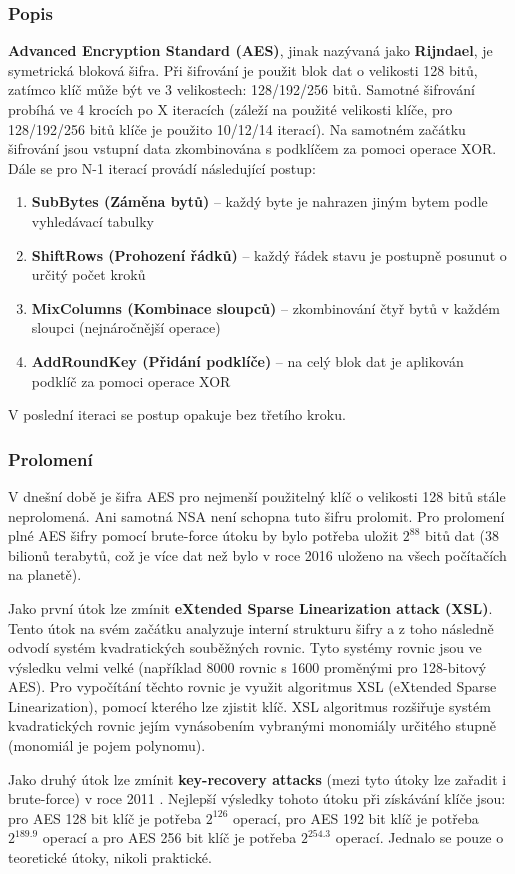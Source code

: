 \documentclass[12pt, a4paper]{article}
\begin{document}
		\subsubsection{Popis}
		\textbf{Advanced Encryption Standard (AES)}, jinak nazývaná jako \textbf{Rijndael}, je symetrická bloková šifra. Při šifrování je použit blok dat o velikosti 128 bitů, zatímco klíč může být ve 3 velikostech: 128/192/256 bitů. Samotné šifrování probíhá ve 4 krocích po X iteracích (záleží na použité velikosti klíče, pro 128/192/256 bitů klíče je použito 10/12/14 iterací). Na samotném začátku šifrování jsou vstupní data zkombinována s podklíčem za pomoci operace XOR. Dále se pro N-1 iterací provádí následující postup:
	\begin{enumerate}
	\item \textbf{SubBytes (Záměna bytů)} -- každý byte je nahrazen jiným bytem podle vyhledávací tabulky
	\item \textbf{ShiftRows (Prohození řádků)} -- každý řádek stavu je postupně posunut o určitý počet kroků
	\item \textbf{MixColumns (Kombinace sloupců)} -- zkombinování čtyř bytů v každém sloupci (nejnáročnější operace)
	\item \textbf{AddRoundKey (Přidání podklíče)} -- na celý blok dat je aplikován podklíč za pomoci operace XOR
	\end{enumerate}
	V poslední iteraci se postup opakuje bez třetího kroku.
		\subsubsection{Prolomení}
		V dnešní době je šifra AES pro nejmenší použitelný klíč o velikosti 128 bitů stále neprolomená. Ani samotná NSA není schopna tuto šifru prolomit. Pro prolomení plné AES šifry pomocí brute-force útoku by bylo potřeba uložit $2^{88}$ bitů dat (38 bilionů terabytů, což je více dat než bylo v roce 2016 uloženo na všech počítačích na planetě).
		\par Jako první útok lze zmínit \textbf{eXtended Sparse Linearization attack (XSL)}. Tento útok na svém začátku analyzuje interní strukturu šifry a z toho následně odvodí systém kvadratických souběžných rovnic. Tyto systémy rovnic jsou ve výsledku velmi velké (například 8000 rovnic s 1600 proměnými pro 128-bitový AES). Pro vypočítání těchto rovnic je využit algoritmus XSL (eXtended Sparse Linearization), pomocí kterého lze zjistit klíč. XSL algoritmus rozšiřuje systém kvadratických rovnic jejím vynásobením vybranými monomiály určitého stupně (monomiál je pojem polynomu).
		\par Jako druhý útok lze zmínit \textbf{key-recovery attacks} (mezi tyto útoky lze zařadit i brute-force) v roce 2011 . Nejlepší výsledky tohoto útoku při získávání klíče jsou: pro AES 128 bit klíč je potřeba $2^{126}$ operací, pro AES 192 bit klíč je potřeba $2^{189.9}$ operací a pro AES 256 bit klíč je potřeba $2^{254.3}$  operací. Jednalo se pouze o teoretické útoky, nikoli praktické.
\end{document}
